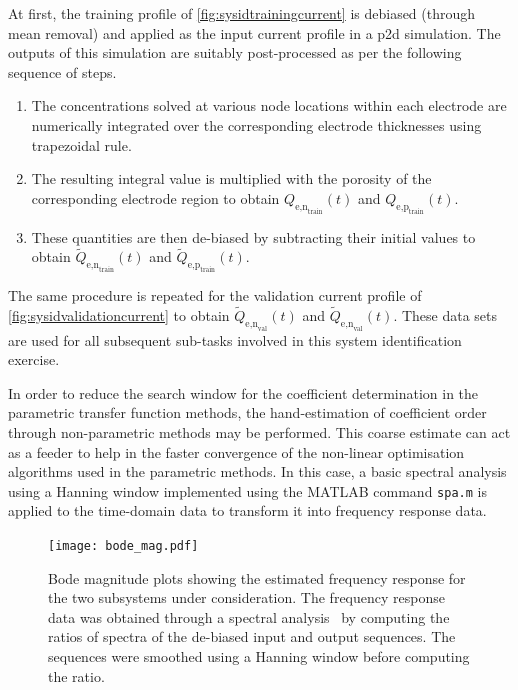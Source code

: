 At first, the training profile of \cref{fig:sysidtrainingcurrent} is
debiased (through mean removal) and applied as the input current profile in a \gls{p2d}
simulation. The outputs of this simulation are suitably post-processed as per
the following sequence of steps.
\begin{enumerate}
    \item The concentrations solved at various node locations within each
        electrode are numerically integrated over the corresponding electrode
        thicknesses using trapezoidal rule.
    \item The resulting integral value is multiplied with the porosity of the
        corresponding electrode region to obtain $Q_{\text{e,n}_\text{train}}(t)$ and
        $Q_{\text{e,p}_\text{train}}(t)$.
    \item These quantities are then de-biased by subtracting their initial
        values to obtain $\widetilde{Q}_{\text{e,n}_\text{train}}(t)$ and
        $\widetilde{Q}_{\text{e,p}_\text{train}}(t)$.
\end{enumerate}

The        same        procedure        is        repeated        for        the
validation       current      profile       of \cref{fig:sysidvalidationcurrent}
to         obtain         $\widetilde{Q}_{\text{e,n}_\text{val}}(t)$         and
$\widetilde{Q}_{\text{e,n}_\text{val}}(t)$.  These data  sets are  used for  all
subsequent sub-tasks involved in this system identification exercise.

In  order to  reduce  the search  window for  the  coefficient determination  in
the  parametric transfer  function methods,  the hand-estimation  of coefficient
order  through non-parametric  methods may  be performed.  This coarse  estimate
can  act as  a  feeder to  help  in  the faster  convergence  of the  non-linear
optimisation algorithms  used in the parametric  methods. In this case,  a basic
spectral analysis  using a Hanning  window implemented using the  MATLAB command
\texttt{spa.m} is applied to the time-domain data to transform it into frequency
response data.

\begin{figure}[!htbp]
    \centering
    \texttt{[image: bode\_mag.pdf]}
    \caption[Bode magnitude plots of the electrolyte time-evolution sub-systems]{%
        Bode magnitude  plots showing the  estimated frequency response  for the
        two  subsystems under  consideration.  The frequency  response data  was
        obtained  through a spectral  analysis \ie~by computing  the ratios  of
        spectra of the de-biased input  and output sequences. The sequences were
        smoothed using a Hanning window before computing the ratio.
    }%
    \label{fig:initialbodemag}
\end{figure}


